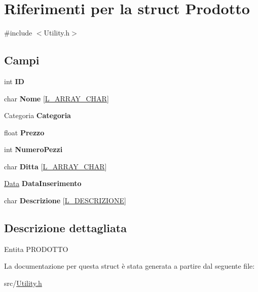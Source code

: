 \hypertarget{struct_prodotto}{}\section{Riferimenti per la struct Prodotto}
\label{struct_prodotto}


{\ttfamily \#include $<$Utility.\+h$>$}

\subsection*{Campi}
\begin{DoxyCompactItemize}
\item 
\mbox{\label{struct_prodotto_a7e5b58848810f410d5346c0f2d1b0585}} 
int {\bfseries ID}
\item 
\mbox{\label{struct_prodotto_a7210b2bd60a2f9667d6af95363036b44}} 
char {\bfseries Nome} \mbox{[}\hyperlink{_utility_8h_ae6fe535e42e6e8133ccf04fada313020}{L\+\_\+\+A\+R\+R\+A\+Y\+\_\+\+C\+H\+AR}\mbox{]}
\item 
\mbox{\label{struct_prodotto_aa713584e198aa46b733510e278e0e02d}} 
Categoria {\bfseries Categoria}
\item 
\mbox{\label{struct_prodotto_ab6d745a4a687a6661eac37ff3093dd1e}} 
float {\bfseries Prezzo}
\item 
\mbox{\label{struct_prodotto_a23cb2ff082d085ce23c670fd42457a3e}} 
int {\bfseries Numero\+Pezzi}
\item 
\mbox{\label{struct_prodotto_aa6b5c1d1601165a0c1dadbdcb40f8970}} 
char {\bfseries Ditta} \mbox{[}\hyperlink{_utility_8h_ae6fe535e42e6e8133ccf04fada313020}{L\+\_\+\+A\+R\+R\+A\+Y\+\_\+\+C\+H\+AR}\mbox{]}
\item 
\mbox{\label{struct_prodotto_aafe7a5cd7e9107dd0202b1056e305de1}} 
\hyperlink{struct_data}{Data} {\bfseries Data\+Inserimento}
\item 
\mbox{\label{struct_prodotto_a3202af217821d82e1ca6280b8de1198a}} 
char {\bfseries Descrizione} \mbox{[}\hyperlink{_utility_8h_a039563522bfa4555e78dfd54a39bdff2}{L\+\_\+\+D\+E\+S\+C\+R\+I\+Z\+I\+O\+NE}\mbox{]}
\end{DoxyCompactItemize}


\subsection{Descrizione dettagliata}
Entita\textquotesingle{} P\+R\+O\+D\+O\+T\+TO 

La documentazione per questa struct è stata generata a partire dal seguente file\+:\begin{DoxyCompactItemize}
\item 
src/\hyperlink{_utility_8h}{Utility.\+h}\end{DoxyCompactItemize}
